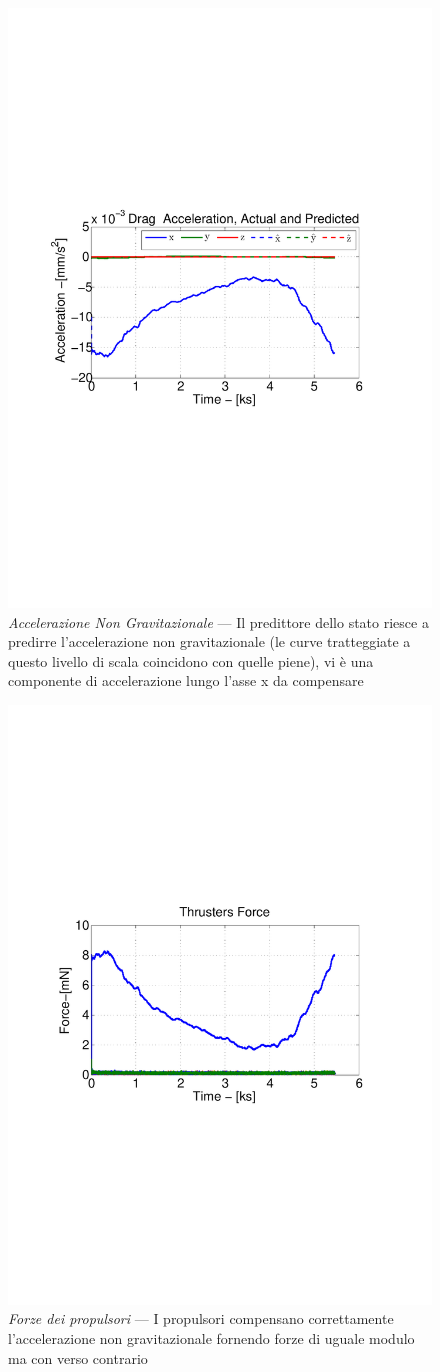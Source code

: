 \begin{figure}
	\includegraphics[width=.6\textwidth,clip=true,trim=2cm 10cm 3cm
	10cm]{control/orbit_control/images/drag_acceleration.pdf}
	\caption{\emph{Accelerazione Non Gravitazionale} --- Il predittore dello stato
	riesce a predirre l'accelerazione non gravitazionale (le curve tratteggiate a 
	questo livello di scala coincidono con 	quelle piene),  vi è una componente di
	accelerazione lungo l'asse x da compensare}
	\label{fig:drag-acceleration}
\end{figure}
\begin{figure}
	\includegraphics[width=.6\textwidth,clip=true,trim=2cm 10cm 3cm
	10cm]{control/orbit_control/images/thrusters_force.pdf}
	\caption{\emph{Forze dei propulsori} --- I propulsori compensano correttamente
	l'accelerazione non gravitazionale fornendo forze di uguale modulo ma con
	verso contrario}
	\label{fig:drag-acceleration}
\end{figure}
